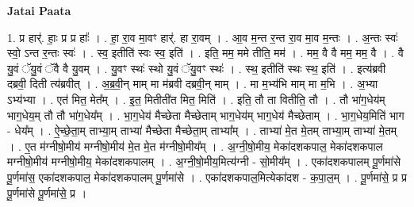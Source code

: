 \documentclass[17pt]{extarticle}
\begin{document}
\textbf{Jatai Paata} \newline

1. प्र हार्॑. हाः॒ प्र प्र हाः᳚ । . हा॒ रा॒व मा॒वꣳ हार्॑. हा रा॒वम् । . आ॒व म॒न्त र॒न्त रा॒व मा॒व म॒न्तः । . अ॒न्तः स्वः॑ स्वो॒ ऽन्त र॒न्तः स्वः॑ । . स्व॒ इतीति॑ स्वः स्व॒ इति॑ । . इति॒ मम॒ ममे तीति॒ मम॑ । . मम॒ वै वै मम॒ मम॒ वै । . वै यु॒वं ॅयु॒वं ॅवै वै यु॒वम् । . यु॒वꣳ स्थः॑ स्थो यु॒वं ॅयु॒वꣳ स्थः॑ । . स्थ॒ इतीति॑ स्थः स्थ॒ इति॑ । . इत्य॑ब्रवी दब्रवी॒ दिती त्य॑ब्रवीत् । . अ॒ब्र॒वी॒न् माम् मा म॑ब्रवी दब्रवी॒न् माम् । . मा म॒भ्य॑भि माम् मा म॒भि । . अ॒भ्या ऽभ्य॑भ्या । . एत॑ मित॒ मेत᳚म् । . इ॒त॒ मितीती॑त मित॒ मिति॑ । . इति॒ तौ ता वितीति॒ तौ । . तौ भा॑ग॒धेय॑म् भाग॒धेय॒म् तौ तौ भा॑ग॒धेय᳚म् । . भा॒ग॒धेय॑ मैच्छेता मैच्छेताम् भाग॒धेय॑म् भाग॒धेय॑ मैच्छेताम् । . भा॒ग॒धेय॒मिति॑ भाग - धेय᳚म् । . ऐ॒च्छे॒ता॒म् ताभ्या॒म् ताभ्या॑ मैच्छेता मैच्छेता॒म् ताभ्या᳚म् । . ताभ्या॑ मे॒त मे॒तम् ताभ्या॒म् ताभ्या॑ मे॒तम् । . ए॒त म॑ग्नीषो॒मीय॑ मग्नीषो॒मीय॑ मे॒त मे॒त म॑ग्नीषो॒मीय᳚म् । . अ॒ग्नी॒षो॒मीय॒ मेका॑दशकपाल॒ मेका॑दशकपाल मग्नीषो॒मीय॑ मग्नीषो॒मीय॒ मेका॑दशकपालम् । . अ॒ग्नी॒षो॒मीय॒मित्य॑ग्नी - सो॒मीय᳚म् । . एका॑दशकपालम् पू॒र्णमा॑से पू॒र्णमा॑स॒ एका॑दशकपाल॒ मेका॑दशकपालम् पू॒र्णमा॑से । . एका॑दशकपाल॒मित्येका॑दश - क॒पा॒ल॒म् । . पू॒र्णमा॑से॒ प्र प्र पू॒र्णमा॑से पू॒र्णमा॑से॒ प्र । \newline
\end{document}
